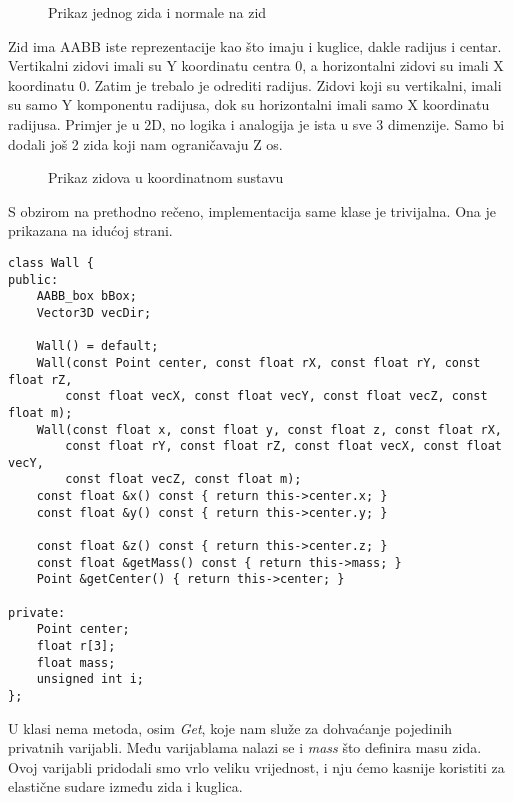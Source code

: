 \begin{figure}[!http]
	\begin{center}
	\end{center}
	\caption {Prikaz jednog zida i normale na zid}
	\label{fig:19}
\end{figure}
Zid ima AABB iste reprezentacije kao što imaju i kuglice, dakle radijus i centar.  Vertikalni zidovi imali su Y koordinatu centra 0, a horizontalni zidovi su imali X koordinatu 0. Zatim je trebalo je odrediti radijus. Zidovi koji su vertikalni, imali su samo Y komponentu radijusa, dok su horizontalni imali samo X koordinatu radijusa. Primjer je u 2D, no logika i analogija je ista u sve 3 dimenzije. Samo bi dodali još 2 zida koji nam ograničavaju Z os.
\begin{figure}[!http]
	\begin{center}
	\end{center}
	\caption {Prikaz zidova u koordinatnom sustavu}
	\label{fig:20}
\end{figure}

S obzirom na prethodno rečeno, implementacija same klase je trivijalna. Ona je prikazana na idućoj strani.
\newpage
\begin{lstlisting}[style=myC++, label = {code:11}, caption={Implementacija klase Wall}]
class Wall {
public:
	AABB_box bBox;
	Vector3D vecDir;

	Wall() = default;
	Wall(const Point center, const float rX, const float rY, const float rZ,
		const float vecX, const float vecY, const float vecZ, const float m);
	Wall(const float x, const float y, const float z, const float rX,
		const float rY, const float rZ, const float vecX, const float vecY,
		const float vecZ, const float m);
	const float &x() const { return this->center.x; }
	const float &y() const { return this->center.y; }

	const float &z() const { return this->center.z; }
	const float &getMass() const { return this->mass; }
	Point &getCenter() { return this->center; }

private:
	Point center;
	float r[3];
	float mass;
	unsigned int i;
};

\end{lstlisting}
U klasi nema metoda, osim \emph{Get}, koje nam služe za dohvaćanje pojedinih privatnih varijabli. Među varijablama nalazi se i \emph{mass} što definira masu zida. Ovoj varijabli pridodali smo vrlo veliku vrijednost, i nju ćemo kasnije koristiti za elastične sudare između zida i kuglica. 
